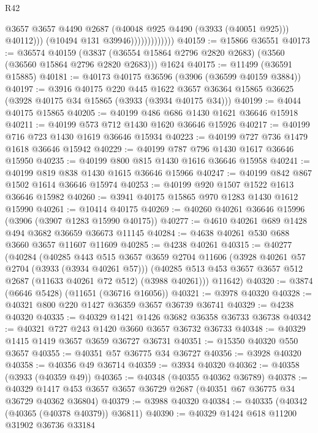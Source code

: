 \begin{lexlean}{R42}
\begin{coremodule}
                                  @3657
                                  @3657
                                  @4490
                                  @2687
                                  (@40048 @925 @4490 (@3933 (@40051 @925)))
                                  @40112)))
                            (@10494 @131 @39946)))))))))))))
@40159 := @15866 @36551
@40173 := @36574
    @40159
    (@3837 (@36554 @15864 @2796 @2820 @2683) (@3560 (@36560 @15864 @2796 @2820 @2683)))
    @1624
@40175 := @11499 (@36591 @15885)
@40181 := @40173 @40175 @36596 (@3906 (@36599 @40159 @3884))
@40197 := @3916
    @40175
    @220
    @445
    @1622
    @3657
    @36364
    @15865
    @36625
    (@3928 @40175 @34 @15865 (@3933 (@3934 @40175 @34)))
@40199 := @4044 @40175 @15865
@40205 := @40199 @486 @686 @1430 @1621 @36646 @15918
@40211 := @40199 @573 @712 @1430 @1620 @36646 @15926
@40217 := @40199 @716 @723 @1430 @1619 @36646 @15934
@40223 := @40199 @727 @736 @1479 @1618 @36646 @15942
@40229 := @40199 @787 @796 @1430 @1617 @36646 @15950
@40235 := @40199 @800 @815 @1430 @1616 @36646 @15958
@40241 := @40199 @819 @838 @1430 @1615 @36646 @15966
@40247 := @40199 @842 @867 @1502 @1614 @36646 @15974
@40253 := @40199 @920 @1507 @1522 @1613 @36646 @15982
@40260 := @3941 @40175 @15865 @970 @1283 @1430 @1612 @15990
@40261 := @10414 @40175
@40269 := @40260 @40261 @36646 @15996 (@3906 (@3907 @1283 @15990 @40175))
@40277 := @4610 @40261 @689 @1428 @494 @3682 @36659 @36673 @11145
@40284 := @4638 @40261 @530 @688 @3660 @3657 @11607 @11609
@40285 := @4238 @40261
@40315 := @40277
    (@40284
      (@40285
        @443
        @515
        @3657
        @3659
        @2704
        @11606
        (@3928 @40261 @57 @2704 (@3933 (@3934 @40261 @57)))
        (@40285 @513 @453 @3657 @3657 @512 @2687 (@11633 @40261 @72 @512) (@3988 @40261)))
      @11642)
@40320 := @3874 (@6646 @5428) (@11651 (@36716 @16056))
@40321 := @3978 @40320
@40328 := @40321 @800 @220 @1427 @36359 @3657 @36739 @36741
@40329 := @4238 @40320
@40335 := @40329 @1421 @1426 @3682 @36358 @36733 @36738
@40342 := @40321 @727 @243 @1420 @3660 @3657 @36732 @36733
@40348 := @40329 @1415 @1419 @3657 @3659 @36727 @36731
@40351 := @15350 @40320 @550 @3657
@40355 := @40351 @57 @36775 @34 @36727
@40356 := @3928 @40320
@40358 := @40356 @49 @36714
@40359 := @3934 @40320
@40362 := @40358 (@3933 (@40359 @49))
@40365 := @40348 (@40355 @40362 @36789)
@40378 := @40329 @1417 @453 @3657 @3657 @36729 @2687 (@40351 @67 @36775 @34 @36729 @40362 @36804)
@40379 := @3988 @40320
@40384 := @40335 (@40342 (@40365 (@40378 @40379)) @36811)
@40390 := @40329 @1424 @618 @11200 @31902 @36736 @33184

\end{coremodule}
\end{lexlean}
